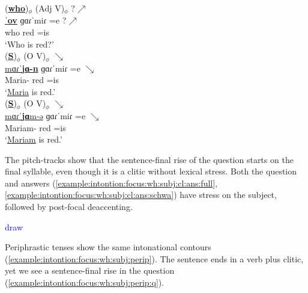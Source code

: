 \begin{exe}
	\ex \begin{xlist}
		
		
		\ex \glll(\underline{\textbf{who}})$_\phi$ ({Adj} V)$_\phi$ ?$\nearrow$ \\
		\underline{ˈ\textbf{ov}} ɡɑɾˈ{miɾ} =e ?$\nearrow$ \\
		who red =is\\ 
		\trans `Who is red?'
		\label{example:intontion:focus:wh:subj:cl:q}
		\\ 
		\ex \glll (\underline{\textbf{S}})$_\phi$ ({O} V)$_\phi$ $\searrow$ \\
		\underline{mɑɾˈ\textbf{jɑ-n}}  ɡɑɾˈ{miɾ} =e   $\searrow$ \\
		Maria-{} red =is\\ 
		\trans `\underline{Maria} is red.' 
		\label{example:intontion:focus:wh:subj:cl:ans:full}
		\\  
		\ex \glll (\underline{\textbf{S}})$_\phi$ ({O} V)$_\phi$  $\searrow$ \\
		\underline{mɑɾˈ\textbf{jɑ}m-ə} ɡɑɾˈ{miɾ} =e   $\searrow$ \\
		Mariam-{} red =is\\ 
		\trans `\underline{Mariam} is red.' 
		\label{example:intontion:focus:wh:subj:cl:ans:schwa}
		\\  
		
		
	\end{xlist}
\end{exe}

The pitch-tracks show that the sentence-final rise of the question starts on the final syllable, even though it is a clitic without lexical stress. Both the question and answers (\ref{example:intontion:focus:wh:subj:cl:ans:full}, \ref{example:intontion:focus:wh:subj:cl:ans:schwa}) have stress on the subject, followed by post-focal deaccenting. 


\textcolor{blue}{draw}

Periphrastic tenses show the same intonational contours (\ref{example:intontion:focus:wh:subj:perip}). The sentence ends in a  verb plus clitic, yet we see a sentence-final rise in the question (\ref{example:intontion:focus:wh:subj:perip:q}). 


